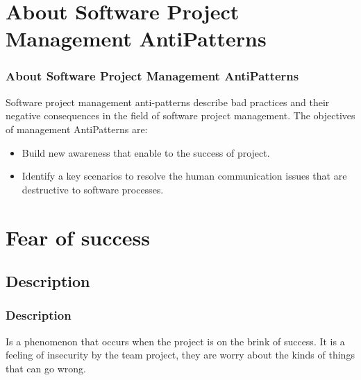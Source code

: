 \documentclass{beamer}
\begin{document}
\section{About Software Project Management AntiPatterns}
\begin{frame}
\frametitle{About Software Project Management AntiPatterns}
Software project management anti-patterns describe bad practices and their negative consequences in the field of software project management. The objectives of management AntiPatterns are:\\
\begin{itemize}
\item Build new awareness that enable to the success of project.
\item Identify a key scenarios to resolve the  human communication issues that are destructive to software processes.
\end{itemize}
\end{frame}
\section{Fear of success}
\subsection{Description}
\begin{frame}
\frametitle{Description}
Is a phenomenon that occurs when the project is on the brink of success. It is a feeling of insecurity by the team project, they are worry about the kinds of things that can go wrong.
\end{frame}
\end{document}
